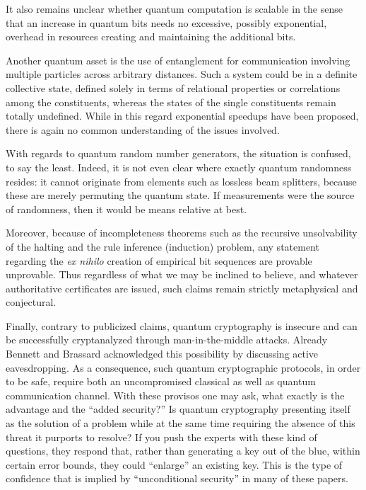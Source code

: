 \documentclass[%
 preprint,
 showpacs,
 showkeys,
 preprintnumbers,
 amsmath,amssymb,
 aps,
  pra,
  longbibliography,
 ]{revtex4-1}
\begin{document}
It also remains unclear whether quantum computation is scalable in the sense that an increase in quantum bits needs
no excessive, possibly exponential, overhead in resources creating and maintaining the additional bits.

Another quantum asset is the use of entanglement for communication involving multiple particles
across arbitrary distances.
Such a system could be in a definite collective state,
defined solely in terms of relational properties or correlations among the constituents,
whereas the states of the single constituents remain totally undefined.
While in this regard exponential speedups have been proposed,
there is again no common understanding of the issues involved.

With regards to quantum random number generators, the situation is confused, to say the least.
Indeed, it is not even clear where exactly quantum randomness resides: it cannot originate
from elements such as lossless beam splitters, because these are merely permuting the quantum state.
If measurements were the source of randomness, then it would be means relative at best.

Moreover, because of incompleteness theorems
such as the recursive unsolvability of the halting and the rule inference (induction) problem,
any statement regarding the {\it ex nihilo} creation of empirical bit sequences are provable unprovable.
Thus regardless of what we may be inclined to believe,
and whatever authoritative certificates are issued,
such claims remain strictly metaphysical and conjectural.

Finally, contrary to publicized claims,
quantum cryptography is insecure and can be successfully cryptanalyzed through man-in-the-middle attacks.
Already Bennett and Brassard acknowledged this possibility by discussing active eavesdropping.
As a consequence, such quantum cryptographic protocols, in order to be safe,
require both an uncompromised classical as well as quantum communication channel.
With these provisos one may ask, what exactly is the advantage and the ``added security?''
Is quantum cryptography presenting itself as the solution of a problem
while at the same time requiring the absence of this threat it purports to resolve?
If you push the experts with these kind of questions, they respond that, rather than generating a key out of the blue,
within certain error bounds, they could ``enlarge'' an existing key.
This is the type of confidence that is implied by ``unconditional security'' in many of these papers.
\end{document}

